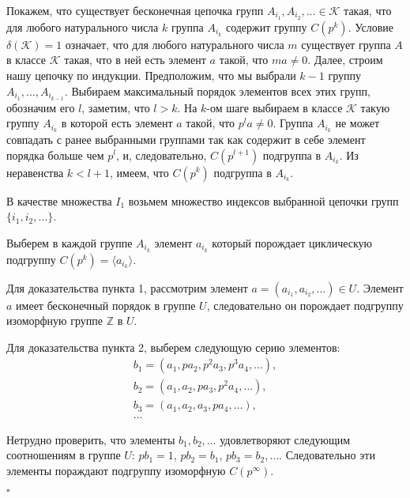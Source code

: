 \documentclass[a4paper,11pt,twoside]{article}
\def\proof{{\noindent{\bf Доказательство.}} }
\def\K{{\mathcal{K}}}
\def\Z{{\mathbb{Z}}}
\begin{document}
\proof Покажем, что существует бесконечная цепочка групп $A_{i_1}, A_{i_2}, \ldots \in \K$ такая, что для любого натурального числа $k$ группа $A_{i_k}$ содержит группу $C(p^k)$. Условие $\delta(\K) = 1$ означает, что для любого натурального числа $m$ существует группа $A$ в классе $\K$ такая, что в ней есть элемент $a$ такой, что $ma \neq 0$. Далее, строим нашу цепочку по индукции. Предположим, что мы выбрали $k-1$ группу $A_{i_1}, \ldots, A_{i_{k-1}}$. Выбираем максимальный порядок элементов всех этих групп, обозначим его $l$, заметим, что $l > k$. На $k$-ом шаге выбираем в классе $\K$ такую группу $A_{i_k}$ в которой есть элемент $a$ такой, что $p^{l} a \neq 0$. Группа $A_{i_k}$ не может совпадать с ранее выбранными группами так как содержит в себе элемент порядка больше чем $p^l$, и, следовательно, $C(p^{l+1})$ подгруппа в $A_{i_k}$. Из неравенства $k < l+1$, имеем, что $C(p^k)$ подгруппа в $A_{i_k}$.

В качестве множества $I_1$ возьмем множество индексов выбранной цепочки групп $\{i_1, i_2, \ldots\}$.

Выберем в каждой группе $A_{i_k}$ элемент $a_{i_k}$ который порождает циклическую подгруппу $C(p^k) = \langle a_{i_k}\rangle$.

Для доказательства пункта 1, рассмотрим элемент $a = (a_{i_1}, a_{i_2}, \ldots) \in U$. Элемент $a$ имеет бесконечный порядок в группе $U$, следовательно он порождает подгруппу изоморфную группе $\Z$ в $U$. 

Для доказательства пункта 2, выберем следующую серию элементов:
$$\begin{array}{l}
b_1 = (a_1, p a_2, p^2 a_3, p^3 a_4, \ldots), \\
b_2 = (a_1, a_2, p a_3, p^2 a_4, \ldots), \\
b_3 = (a_1, a_2, a_3, p a_4, \ldots), \\
\ldots
\end{array}$$

Нетрудно проверить, что элементы $b_1, b_2, \ldots$ удовлетворяют следующим соотношениям в группе $U$: $pb_1 = 1$, $pb_2 = b_1$, $pb_3 = b_2, \ldots$. Следовательно эти элементы пораждают подгруппу изоморфную $C(p^\infty)$.

$\square$
\end{document}
